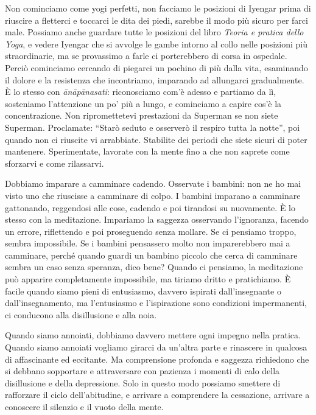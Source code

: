 Non cominciamo come yogi perfetti, non facciamo le posizioni di Iyengar
prima di riuscire a fletterci e toccarci le dita dei piedi, sarebbe il
modo più sicuro per farci male. Possiamo anche guardare tutte le
posizioni del libro \emph{Teoria e pratica dello Yoga}, e vedere Iyengar
che si avvolge le gambe intorno al collo nelle posizioni più
straordinarie, ma se provassimo a farle ci porterebbero di corsa in
ospedale. Perciò cominciamo cercando di piegarci un pochino di più dalla
vita, esaminando il dolore e la resistenza che incontriamo, imparando ad
allungarci gradualmente. È lo stesso con \emph{ānāpānasati}:
riconosciamo com'è adesso e partiamo da lì, sosteniamo l'attenzione un
po' più a lungo, e cominciamo a capire cos'è la concentrazione. Non
ripromettetevi prestazioni da Superman se non siete Superman.
Proclamate: ``Starò seduto e osserverò il respiro tutta la notte'', poi
quando non ci riuscite vi arrabbiate. Stabilite dei periodi che siete
sicuri di poter mantenere. Sperimentate, lavorate con la mente fino a
che non saprete come sforzarvi e come rilassarvi.

Dobbiamo imparare a camminare cadendo. Osservate i bambini: non ne ho
mai visto uno che riuscisse a camminare di colpo. I bambini imparano a
camminare gattonando, reggendosi alle cose, cadendo e poi tirandosi su
nuovamente. È lo stesso con la meditazione. Impariamo la saggezza
osservando l'ignoranza, facendo un errore, riflettendo e poi proseguendo
senza mollare. Se ci pensiamo troppo, sembra impossibile. Se i bambini
pensassero molto non imparerebbero mai a camminare, perché quando guardi
un bambino piccolo che cerca di camminare sembra un caso senza speranza,
dico bene? Quando ci pensiamo, la meditazione può apparire completamente
impossibile, ma tiriamo dritto e pratichiamo. È facile quando siamo
pieni di entusiasmo, davvero ispirati dall'insegnante o
dall'insegnamento, ma l'entusiasmo e l'ispirazione sono condizioni
impermanenti, ci conducono alla disillusione e alla noia.

Quando siamo annoiati, dobbiamo davvero mettere ogni impegno nella
pratica. Quando siamo annoiati vogliamo girarci da un'altra parte e
rinascere in qualcosa di affascinante ed eccitante. Ma comprensione
profonda e saggezza richiedono che si debbano sopportare e attraversare
con pazienza i momenti di calo della disillusione e della depressione.
Solo in questo modo possiamo smettere di rafforzare il ciclo
dell'abitudine, e arrivare a comprendere la cessazione, arrivare a
conoscere il silenzio e il vuoto della mente.

